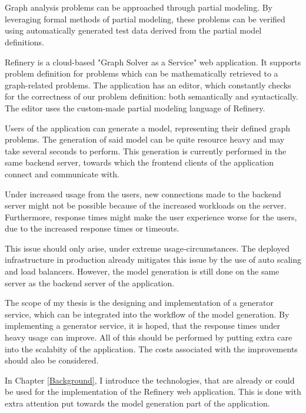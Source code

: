 \chapter{\bevezetes}

Graph analysis problems can be approached through partial modeling. By leveraging
formal methods of partial modeling, these problems can be verified using automatically
generated test data derived from the partial model definitions.

Refinery \cite{refinery} is a cloud-based "Graph Solver as a Service" web application. It supports problem
definition for problems which can be mathematically retrieved to a graph-related problems.
The application has an editor, which constantly checks for the correctness of our problem definition:
both semantically and syntactically. The editor uses the custom-made partial modeling language of Refinery.

Users of the application can generate a model, representing their defined graph problems. The generation of 
said model can be quite resource heavy and may take several seconds to perform. 
This generation is currently performed in the same backend server, towards which the frontend clients of the application
connect and communicate with. 

Under increased usage from the users, new connections made to the backend server might not be possible because of 
the increased workloads on the server. Furthermore, response times might make the user experience worse for the users, due to the increased response
times or timeouts.

This issue should only arise, under extreme usage-circumstances. The deployed infrastructure in production already mitigates this issue by 
the use of auto scaling and load balancers. However, the model generation is still done on the same server as the backend server of 
the application.

The scope of my thesis is the designing and implementation of a generator service, which can be integrated into the workflow of the model generation.
By implementing a generator service, it is hoped, that the response times under heavy usage can improve. All of this should be performed by 
putting extra care into the scalabity of the application. The costs associated with the improvements should also be considered.

In Chapter \ref{Background}, I introduce the technologies, that are already or could be used for the 
implementation of the Refinery web application.
This is done with extra attention put towards the model generation part of the application.

